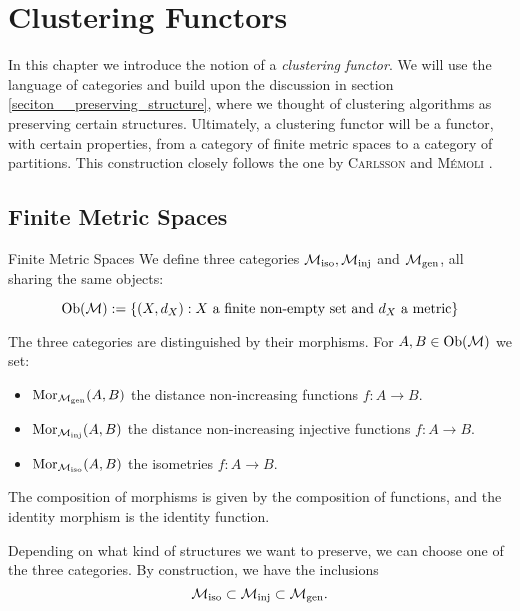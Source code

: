 \chapter{Clustering Functors}
\label{chapter__clustering_functor}

In this chapter we introduce the notion of a \emph{clustering functor}.
We will use the language of categories and build upon the discussion in section \ref{seciton__preserving_structure}, where we thought of clustering algorithms as preserving certain structures.
Ultimately, a clustering functor will be a functor, with certain properties, from a category of finite metric spaces to a category of partitions.
This construction closely follows the one by \textsc{Carlsson} and \textsc{M\'emoli} \cite{Carlsson2010}.

\section{Finite Metric Spaces}
\label{section__finite_metric_spaces}

\begin{definition}{Finite Metric Spaces \cite[Sec.~3.2]{Carlsson2010}}{}
We define three categories ${\mathcal{M}_\mathrm{iso}}, {\mathcal{M}_\mathrm{inj}}$ and ${\mathcal{M}_\mathrm{gen}}$, all sharing the same objects:

\begin{equation*}
\mathrm {Ob}(\mathcal{M}) := \{(X,d_X): \text{$X$ a finite non-empty set and $d_X$ a metric}\}
\end{equation*}

The three categories are distinguished by their morphisms. For $A, B \in \mathrm {Ob}(\mathcal{M})$ we set:
\begin{itemize}
    \item $\mathrm {Mor}_{\mathcal{M}_\mathrm{gen}}(A,B)$ the distance non-increasing functions $f: A \to B$.
    \item $\mathrm {Mor}_{\mathcal{M}_\mathrm{inj}}(A,B)$ the distance non-increasing injective functions $f: A \to B$.
    \item $\mathrm {Mor}_{\mathcal{M}_\mathrm{iso}}(A,B)$ the isometries $f: A \to B$.
\end{itemize}
The composition of morphisms is given by the composition of functions, and the identity morphism is the identity function.
\end{definition}

Depending on what kind of structures we want to preserve, we can choose one of the three categories.
By construction, we have the inclusions
\begin{equation}
    \label{eq:inclusions_of_finite_metric_space_categories}
    {\mathcal{M}_\mathrm{iso}} \subset {\mathcal{M}_\mathrm{inj}} \subset {\mathcal{M}_\mathrm{gen}}.
\end{equation}


